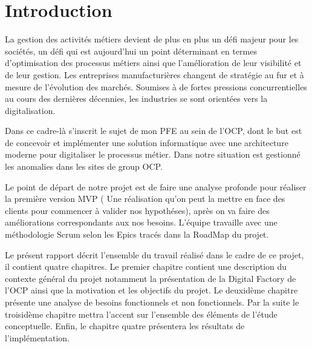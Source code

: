 \chapter{Introduction}


La gestion des activit\'es m\'etiers devient de plus en plus un d\'efi majeur pour les soci\'et\'es, un d\'efi qui est aujourd'hui un point d\'eterminant en termes d'optimisation des processus m\'etiers ainsi que l'am\'elioration de leur visibilit\'e et de leur gestion. Les entreprises manufacturi\`eres changent de strat\'egie au fur et \`a mesure de l'\'evolution des march\'es. Soumises \`a de fortes pressions concurrentielles au cours des derni\`eres d\'ecennies, les industries se sont orient\'ees vers la digitalisation.

Dans ce cadre-l\`a s'inscrit le sujet de mon \gls{PFE} au sein de l'\gls{OCP}, dont le but est de concevoir et impl\'ementer une solution informatique avec une architecture moderne pour digitaliser le processus m\'etier. Dans notre situation est gestionn\'e les anomalies dans les sites de group \gls{OCP}.

Le point de d\'epart de notre projet est de faire une analyse profonde pour r\'ealiser la premi\`ere version \gls{MVP} ( Une r\'ealisation qu'on peut la mettre en face des clients pour commencer \`a valider nos hypoth\'eses), apr\`es on va faire des am\'eliorations correspondants aux nos besoins. L'\'equipe  travaille avec une m\'ethodologie Scrum selon les Epics trac\'es dans la RoadMap du projet.

Le pr\'esent rapport d\'ecrit l'ensemble du travail r\'ealis\'e dans le cadre de ce projet, il contient quatre chapitres. Le premier chapitre contient une description du contexte g\'en\'eral du projet notamment la pr\'esentation de la Digital Factory de l'\gls{OCP} ainsi que la motivation et les objectifs du projet. Le deuxid\`eme chapitre pr\'esente une analyse de besoins fonctionnels et non fonctionnels. Par la suite le troisid\`eme chapitre mettra l'accent sur l'ensemble des \'el\'ements de l'\'etude conceptuelle. Enfin, le chapitre quatre pr\'esentera les r\'esultats de l'impl\'ementation.